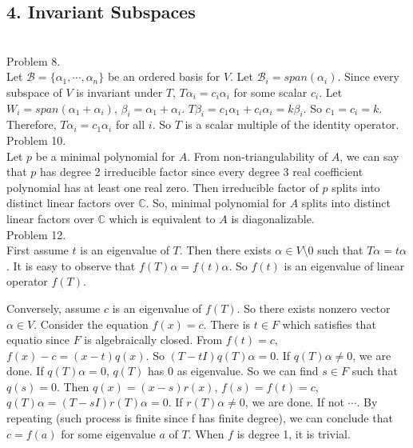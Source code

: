 \subsection*{4. Invariant Subspaces}\hfill \\

Problem 8. \\

Let $\mathcal{B} = \{ \alpha_1, \cdots, \alpha_n \}$ be an ordered basis for $V$.
Let $\mathcal{B}_i = span(\alpha_i)$.
Since every subspace of $V$ is invariant under $T$, $T \alpha_i = c_i \alpha_i$ for some scalar $c_i$.
Let $W_i = span(\alpha_1 + \alpha_i)$, $\beta_i = \alpha_1 + \alpha_i$.
$T \beta_i = c_1 \alpha_1 + c_i \alpha_i = k\beta_i$. So $c_1 = c_i = k$.
Therefore, $T \alpha_i = c_1 \alpha_i$ for all $i$. So $T$ is a scalar multiple of the identity operator.\\

Problem 10. \\

Let $p$ be a minimal polynomial for $A$.
From non-triangulability of $A$, we can say that $p$ has degree 2 irreducible factor since every degree 3 real coefficient polynomial has at least one real zero.
Then irreducible factor of $p$ splits into distinct linear factors over $\mathbb{C}$.
So, minimal polynomial for $A$ splits into distinct linear factors over $\mathbb{C}$ which is equivalent to $A$ is diagonalizable.\\

Problem 12. \\

First assume $t$ is an eigenvalue of $T$. Then there exists $\alpha \in V \setminus 0$
such that $T\alpha = t\alpha$. It is easy to observe that $f(T)\alpha = f(t)\alpha$.
So $f(t)$ is an eigenvalue of linear operator $f(T)$.

Conversely, assume $c$ is an eigenvalue of $f(T)$. So there exists nonzero vector $\alpha \in V$.
Consider the equation $f(x) = c$. There is $t \in F$ which satisfies that equatio since $F$ is algebraically closed.
From $f(t) = c$, $f(x) - c = (x-t)q(x)$. So $(T-tI)q(T)\alpha = 0$. If $q(T)\alpha \ne 0$, we are done.
If $q(T)\alpha = 0$, $q(T)$ has $0$ as eigenvalue. So we can find $s \in F$ such that $q(s) = 0$. 
Then $q(x) = (x-s)r(x)$, $f(s) = f(t) = c$, $q(T)\alpha = (T-sI)r(T)\alpha = 0$. If $r(T)\alpha \ne 0$, we are done.
If not $\cdots$. By repeating (such process is finite since f has finite degree), we can conclude that 
$c = f(a)$ for some eigenvalue $a$ of $T$. When $f$ is degree 1, it is trivial.

